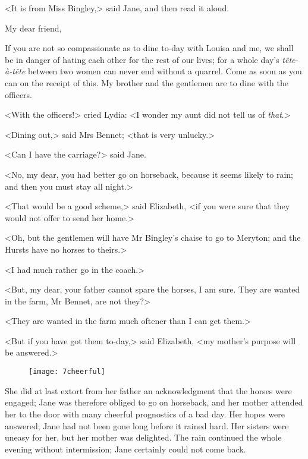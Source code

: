 <It is from Miss Bingley,> said Jane, and then read it aloud.

\begin{mail}{}{My dear friend,}

If you are not so compassionate as to dine to-day with Louisa and me, we shall be in danger of hating each other for the rest of our lives; for a whole day's \textit{tête-à-tête} between two women can never end without a quarrel. Come as soon as you can on the receipt of this. My brother and the gentlemen are to dine with the officers.

\end{mail}

<With the officers!> cried Lydia: <I wonder my aunt did not tell us of \textit{that}.>

<Dining out,> said Mrs Bennet; <that is very unlucky.>

<Can I have the carriage?> said Jane.

<No, my dear, you had better go on horseback, because it seems likely to rain; and then you must stay all night.>

<That would be a good scheme,> said Elizabeth, <if you were sure that they would not offer to send her home.>

<Oh, but the gentlemen will have Mr Bingley's chaise to go to Meryton; and the Hursts have no horses to theirs.>

<I had much rather go in the coach.>

<But, my dear, your father cannot spare the horses, I am sure. They are wanted in the farm, Mr Bennet, are not they?>


<They are wanted in the farm much oftener than I can get them.>

<But if you have got them to-day,> said Elizabeth, <my mother's purpose will be answered.>

\begin{a4}
	\begin{figure}[tbh]
	\centering
	\texttt{[image: 7cheerful]}
	\end{figure}
\end{a4}

She did at last extort from her father an acknowledgment that the horses were engaged; Jane was therefore obliged to go on horseback, and her mother attended her to the door with many cheerful prognostics of a bad day. Her hopes were answered; Jane had not been gone long before it rained hard. Her sisters were uneasy for her, but her mother was delighted. The rain continued the whole evening without intermission; Jane certainly could not come back.

